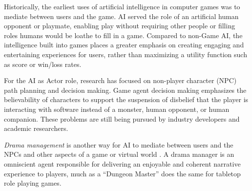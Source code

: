 \documentclass[conference]{IEEEtran}
\begin{document}
%
%
Historically, the earliest uses of artificial intelligence in computer games was to mediate between users and the game.
AI served the role of an artificial human opponent or playmate, enabling play without requiring other people or filling roles humans would be loathe to fill in a game.
%
Compared to non-Game AI, the intelligence built into games places a greater emphasis on creating engaging and entertaining experiences for users, 
rather than maximizing a utility function such as score or win/loss rates. 

For the AI as Actor role, research has focused on non-player character (NPC) path planning and decision making.
Game agent decision making emphasizes the believability of characters to support the suspension of disbelief that the player is interacting with software instead of a monster, human opponent, or human companion.
These problems are still being pursued by industry developers and academic researchers.

{\em Drama management} is another way for AI to mediate between users and the NPCs and other aspects of a game or virtual world \cite{mateas1999:oz-review-dm, roberts2008:dm-review, riedl2013:in-aimag}. 
A drama manager is an omniscient agent responsible for delivering an enjoyable and coherent narrative experience to players, much as a ``Dungeon Master'' does the same for tabletop role playing games.
\end{document}
